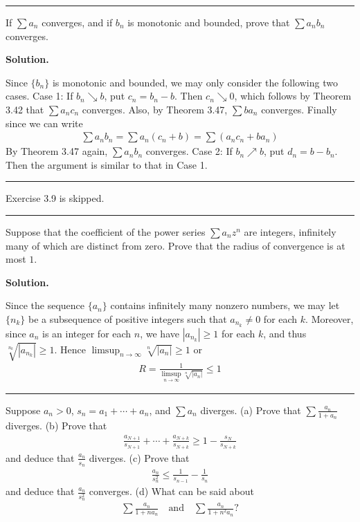 \documentclass[12pt]{article}
\theoremstyle{definition}
\begin{document}
\bigskip\noindent\hrule\bigskip

If $\sum a_n$ converges, and if $b_n$ is monotonic and bounded, prove that $\sum a_nb_n$ converges.

\smallskip
\noindent\textbf{Solution.}\quad

Since $\{b_n\}$ is monotonic and bounded, we may only consider the following two cases.
Case 1: If $b_n\searrow b$, put $c_n=b_n-b$. Then $c_n\searrow 0$, which follows by Theorem 3.42 that $\sum a_nc_n$ converges. Also, by Theorem 3.47, $\sum ba_n$ converges. Finally since we can write
\begin{align*}
\sum a_nb_n=\sum a_n\left(c_n+b\right)=\sum\left(a_nc_n+ba_n\right)
\end{align*}
By Theorem 3.47 again, $\sum a_nb_n$ converges.
Case 2: If $b_n\nearrow b$, put $d_n=b-b_n$. Then the argument is similar to that in Case 1.



\bigskip\noindent\hrule\bigskip

Exercise 3.9 is skipped.


\bigskip\noindent\hrule\bigskip

Suppose that the coefficient of the power series $\sum a_nz^n$ are integers, infinitely many of which are distinct from zero. Prove that the radius of convergence is at most $1$.

\smallskip
\noindent\textbf{Solution.}\quad

Since the sequence $\{a_n\}$ contains infinitely many nonzero numbers, we may let $\{n_k\}$ be a subsequence of positive integers such that $a_{n_k}\ne 0$ for each $k$. Moreover, since $a_n$ is an integer for each $n$, we have $\left\vert a_{n_k}\right\vert\ge 1$ for each $k$, and thus $\sqrt[n_k]{\left\vert a_{n_k}\right\vert}\ge 1$. Hence $\limsup_{n\to\infty}\sqrt[n]{\left\vert a_n\right\vert}\ge 1$ or
\begin{align*}
R=\frac{1}{\displaystyle \limsup_{n\to\infty}\sqrt[n]{\left\vert a_n\right\vert}}\le 1
\end{align*}



\bigskip\noindent\hrule\bigskip

Suppose $a_n>0$, $s_n=a_1+\cdots+a_n$, and $\sum a_n$ diverges.
(a) Prove that $\sum\frac{a_n}{1+a_n}$ diverges.
(b) Prove that
\begin{align*}
\frac{a_{N+1}}{s_{N+1}}+\cdots+\frac{a_{N+k}}{s_{N+k}}\ge 1-\frac{s_N}{s_{N+k}}
\end{align*}
and deduce that $\frac{a_n}{s_n}$ diverges.
(c) Prove that
\begin{align*}
\frac{a_n}{s_n^2}\le\frac{1}{s_{n-1}}-\frac{1}{s_n}
\end{align*}
and deduce that $\frac{a_n}{s_n^2}$ converges.
(d) What can be said about
\begin{align*}
\sum\frac{a_n}{1+na_n}\quad\mbox{and}\quad \sum\frac{a_n}{1+n^2a_n}?
\end{align*}
\end{document}
